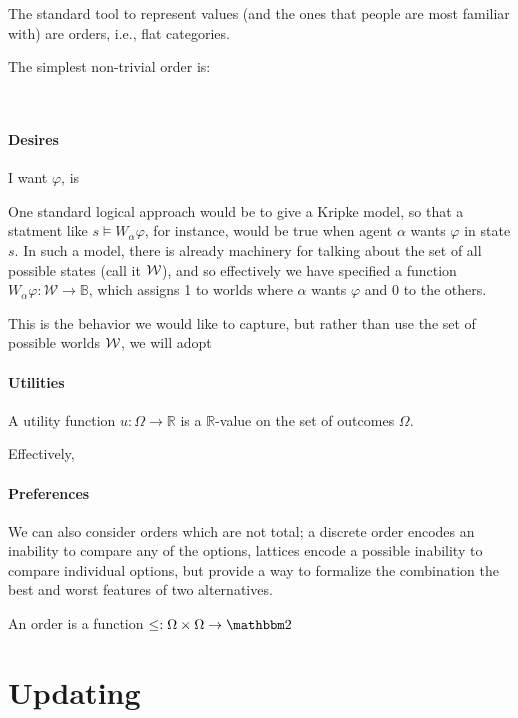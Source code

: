 \documentclass{article}
\begin{document}
	The standard tool to represent values (and the ones that people are most familiar with) are orders, i.e., flat categories. 
	
	The simplest non-trivial order is:
	\begin{center}
		\raisebox{0.7em}{$\mathbb B = $}~
	\end{center}
	
	\subsection{Desires}
	
	I want $\varphi$, is 
	
	One standard logical approach would be to give a Kripke model, so that a statment like $s \vDash W_{\alpha} \varphi$, for instance, would be true when agent $\alpha$ wants $\varphi$ in state $s$. In such a model, there is already machinery for talking about the set of all possible states (call it $\cal W$), and so effectively we have specified a function $W_\alpha \varphi: \mathcal W \to \mathbb B$, which assigns 1 to worlds where $\alpha$ wants $\varphi$ and 0 to the others.
	
	This is the behavior we would like to capture, but rather than use the set of possible worlds $\cal W$, we will adopt 
	
	
	\subsection{Utilities}
	
		
	
	A utility function $u : \Omega \to \mathbb R$ is a $\mathbb R$-value on the set of outcomes $\Omega$. 
	
	Effectively, 

	
	\subsection{Preferences}
	We can also consider orders which are not total; a discrete order encodes an inability to compare any of the options, lattices encode a possible inability to compare individual options, but provide a way to formalize the combination the best and worst features of two alternatives.
	
	
	An order is a function $\leq: \Omega \times \Omega \to \mathbbm 2$
	
	\part{Updating}
	
	\section{}
		
	
	
\end{document}
